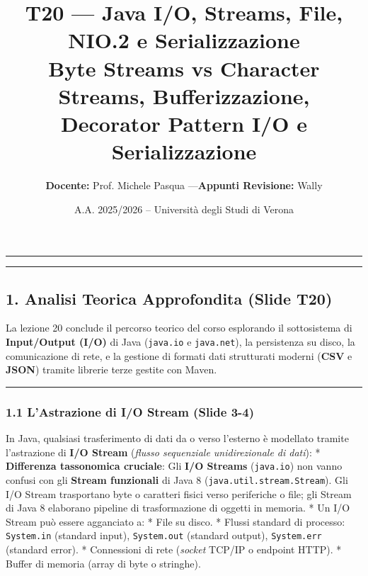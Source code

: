 \documentclass[11pt,a4paper]{article}
\title{\Huge\bfseries\sffamily\color{brandblue} T20 --- Java I/O, Streams, File, NIO.2 e Serializzazione \\[0.3em] \large\sffamily Byte Streams vs Character Streams, Bufferizzazione, Decorator Pattern I/O e Serializzazione}
\author{\textbf{Docente:} Prof. Michele Pasqua \quad---\quad \textbf{Appunti Revisione:} Wally}
\date{A.A. 2025/2026 -- Universit\`a degli Studi di Verona}
\newcommand{\passthrough}[1]{#1}
\begin{document}
\maketitle
\thispagestyle{fancy}
\vspace{-1.2em}
\noindent\textcolor{brandblue}{\rule{\textwidth}{0.8pt}}
\vspace{1.2em}

\begin{center}\rule{0.5\linewidth}{0.5pt}\end{center}

\subsection{1. Analisi Teorica Approfondita (Slide
T20)}\label{analisi-teorica-approfondita-slide-t20}

La lezione 20 conclude il percorso teorico del corso esplorando il
sottosistema di \textbf{Input/Output (I/O)} di Java
(\passthrough{\lstinline!java.io!} e
\passthrough{\lstinline!java.net!}), la persistenza su disco, la
comunicazione di rete, e la gestione di formati dati strutturati moderni
(\textbf{CSV} e \textbf{JSON}) tramite librerie terze gestite con Maven.

\begin{center}\rule{0.5\linewidth}{0.5pt}\end{center}

\subsubsection{1.1 L'Astrazione di I/O Stream (Slide
3-4)}\label{lastrazione-di-io-stream-slide-3-4}

In Java, qualsiasi trasferimento di dati da o verso l'esterno è
modellato tramite l'astrazione di \textbf{I/O Stream} (\emph{flusso
sequenziale unidirezionale di dati}): * \textbf{Differenza tassonomica
cruciale}: Gli \textbf{I/O Streams} (\passthrough{\lstinline!java.io!})
non vanno confusi con gli \textbf{Stream funzionali} di Java 8
(\passthrough{\lstinline!java.util.stream.Stream!}). Gli I/O Stream
trasportano byte o caratteri fisici verso periferiche o file; gli Stream
di Java 8 elaborano pipeline di trasformazione di oggetti in memoria. *
Un I/O Stream può essere agganciato a: * File su disco. * Flussi
standard di processo: \passthrough{\lstinline!System.in!} (standard
input), \passthrough{\lstinline!System.out!} (standard output),
\passthrough{\lstinline!System.err!} (standard error). * Connessioni di
rete (\emph{socket} TCP/IP o endpoint HTTP). * Buffer di memoria (array
di byte o stringhe).
\end{document}
